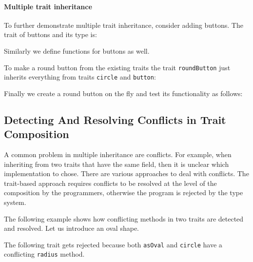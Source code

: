 
\paragraph{Multiple trait inheritance} To further demonstrate multiple
trait inheritance, consider adding buttons. The trait of buttons and its type is:

Similarly we define functions for buttons as well.

\noindent To make a round button from the existing traits the trait \lstinline{roundButton} just inherits everything from
traits \lstinline{circle} and \lstinline{button}:

\noindent Finally we create a round button on the fly and test its functionality
as follows:

\subsection{Detecting And Resolving Conflicts in Trait Composition}
\label{sec:conflicts}

A common problem in multiple inheritance are conflicts. For example,
when inheriting from two traits that have the same field, then it is
unclear which implementation to chose. There are various approaches to
deal with conflicts. The trait-based approach requires conflicts to be
resolved at the level of the composition by the programmers, otherwise
the program is rejected by the type system. 

The following example
shows how conflicting methods in two traits are detected and resolved.
Let us introduce an oval shape.

The following trait gets rejected because both \lstinline{asOval} and
\lstinline{circle} have a conflicting \lstinline{radius} method.

